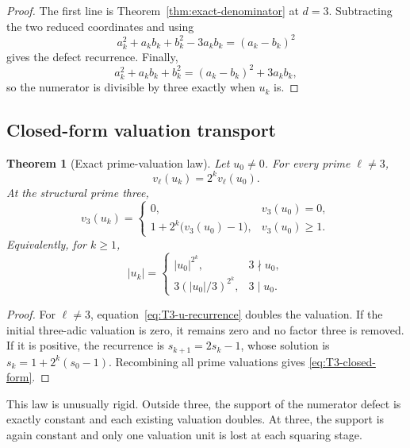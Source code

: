 \documentclass[11pt,oneside]{article}
\newtheorem{theorem}{Theorem}[section]
\theoremstyle{definition}
\theoremstyle{remark}
\begin{document}
\begin{proof}
The first line is Theorem~\ref{thm:exact-denominator} at \(d=3\).  Subtracting the two
reduced coordinates and using
\[
 a_k^2+a_kb_k+b_k^2-3a_kb_k=(a_k-b_k)^2
\]
gives the defect recurrence.  Finally,
\[
 a_k^2+a_kb_k+b_k^2=(a_k-b_k)^2+3a_kb_k,
\]
so the numerator is divisible by three exactly when \(u_k\) is.
\end{proof}

\subsection{Closed-form valuation transport}

\begin{theorem}[Exact prime-valuation law]
\label{thm:T3-valuations}
Let \(u_0\ne0\).  For every prime \(\ell\ne3\),
\begin{equation}
 v_\ell(u_k)=2^k v_\ell(u_0).
 \label{eq:non3-valuations}
\end{equation}
At the structural prime three,
\begin{equation}
 v_3(u_k)=
 \begin{cases}
 0,&v_3(u_0)=0,\\
 1+2^k\bigl(v_3(u_0)-1\bigr),&v_3(u_0)\ge1.
 \end{cases}
 \label{eq:3-valuation}
\end{equation}
Equivalently, for \(k\ge1\),
\begin{equation}
 |u_k|=
 \begin{cases}
 |u_0|^{2^k},&3\nmid u_0,\\
 3\left(|u_0|/3\right)^{2^k},&3\mid u_0.
 \end{cases}
 \label{eq:T3-closed-form}
\end{equation}
\end{theorem}

\begin{proof}
For \(\ell\ne3\), equation~\eqref{eq:T3-u-recurrence} doubles the valuation.  If the
initial three-adic valuation is zero, it remains zero and no factor three is removed.  If it
is positive, the recurrence is \(s_{k+1}=2s_k-1\), whose solution is
\(s_k=1+2^k(s_0-1)\).  Recombining all prime valuations gives
\eqref{eq:T3-closed-form}.
\end{proof}

This law is unusually rigid.  Outside three, the support of the numerator defect is exactly
constant and each existing valuation doubles.  At three, the support is again constant and
only one valuation unit is lost at each squaring stage.
\end{document}
